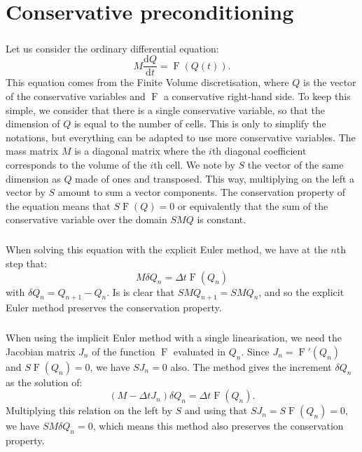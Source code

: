\appendix
\chapter{Conservative preconditioning}
\label{appendix:conservative_preconditioning}

  \paragraph{}
  Let us consider the ordinary differential equation:
  \begin{equation}
    M \frac{\mathrm{d}Q}{\mathrm{d} t} = \operatorname{F}\left(Q\left(t\right)\right) .
  \end{equation}
  This equation comes from the Finite Volume discretisation, where $Q$ is the vector of the conservative variables and $\operatorname{F}$ a conservative right-hand side.
  To keep this simple, we consider that there is a single conservative variable, so that the dimension of $Q$ is equal to the number of cells.
  This is only to simplify the notations, but everything can be adapted to use more conservative variables.
  The mass matrix $M$ is a diagonal matrix where the $i$th diagonal coefficient corresponds to the volume of the $i$th cell.
  We note by $S$ the vector of the same dimension as $Q$ made of ones and transposed.
  This way, multiplying on the left a vector by $S$ amount to sum a vector components.
  The conservation property of the equation means that $S \operatorname{F}\left(Q\right) = 0$ or equivalently that the sum of the conservative variable over the domain $SMQ$ is constant.

  \paragraph{}
  When solving this equation with the explicit Euler method, we have at the $n$th step that:
  \begin{equation}
    M\delta Q_n = \Delta t \operatorname{F}\left(Q_n\right)
  \end{equation}
  with $\delta Q_n = Q_{n+1} - Q_n$.
  Is is clear that $SMQ_{n+1} = SMQ_n$, and so the explicit Euler method preserves the conservation property.

  \paragraph{}
  When using the implicit Euler method with a single linearisation, we need the Jacobian matrix $J_n$ of the function $\operatorname{F}$ evaluated in $Q_n$.
  Since $J_n = \operatorname{F}'\left(Q_n\right)$ and $S\operatorname{F}\left(Q_n\right) = 0$, we have $SJ_n = 0$ also.
  The method gives the increment $\delta Q_n$ as the solution of:
  \begin{equation}
    \left(M - \Delta t J_n\right) \delta Q_n = \Delta t \operatorname{F}\left(Q_n\right) .
  \end{equation}
  Multiplying this relation on the left by $S$ and using that $SJ_n = S\operatorname{F}\left(Q_n\right) = 0$, we have $SM\delta Q_n = 0$, which means this method also preserves the conservation property.

